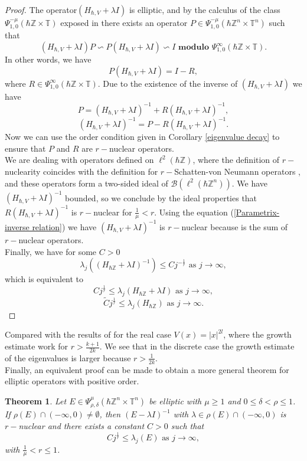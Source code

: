 \documentclass[pdflatex,sn-mathphys-num]{sn-jnl}%
\theoremstyle{thmstyleone}%
\newtheorem{theorem}{Theorem}
\theoremstyle{thmstyletwo}%
\theoremstyle{thmstylethree}%
\begin{document}
\begin{proof}
    The operator$(H_{\hbar,V}+\lambda I)$  is elliptic, and by the calculus of the class $\Psi^{-\mu}_{1,0}(\hbar\mathbb{Z}\times\mathbb{T})$ exposed in \cite[Theorem 4.7]{botchway2024semi} there exists an operator $P\in \Psi^{-\mu}_{1,0}(\hbar\mathbb{Z}^n\times\mathbb{T}^n)$ such that 
    \[ (H_{\hbar,V}+\lambda I)P\backsim P(H_{\hbar,V}+\lambda I)\backsim I \textbf{ modulo } \Psi^{\infty}_{1,0}(\hbar\mathbb{Z}\times\mathbb{T}).  \]
    In other words, we have 
    \[ P(H_{\hbar,V}+\lambda I)=I -R,  \]
    where $R\in\Psi^{\infty}_{1,0}(\hbar\mathbb{Z}\times\mathbb{T})$. Due to the existence of the inverse of $(H_{\hbar,V}+\lambda I) $ we have
    \[P=(H_{\hbar,V}+\lambda I)^{-1}+R(H_{\hbar,V}+\lambda I)^{-1}, \]
    \begin{equation}\label{Parametrix-inverse relation}
    (H_{\hbar,V}+\lambda I)^{-1}=P-R(H_{\hbar,V}+\lambda I)^{-1}.
    \end{equation}
    Now we can use the order condition given in Corollary \ref{eigenvalue decay} to ensure that $P$ and $R$ are $r-$nuclear operators. \\
    \indent We are dealing with operators defined on $\ell^2(\hbar\mathbb{Z})$, where the definition of $r-$nuclearity coincides with the definition for $r-$Schatten-von Neumann operators \cite{oloff}, and these operators form a two-sided ideal of $\mathcal{B}(\ell^2(\hbar\mathbb{Z}^n))$. We have $(H_{\hbar,V}+\lambda I)^{-1}$ bounded, so we conclude by the ideal properties that $R(H_{\hbar,V}+\lambda I)^{-1}$ is $r-$nuclear for $\frac{1}{\mu}<r$. Using the equation (\ref{Parametrix-inverse relation}) we have $(H_{\hbar,V}+\lambda I)^{-1}$ is $r-$nuclear because is the sum of $r-$nuclear operators.\\
    Finally, we have for some $C>0$ 
    \[ \lambda_j\left( (H_{\hbar\mathbb{Z}}+\lambda I)^{-1}\right) \leq C j^{-\frac{1}{r}}    \text{ as } j\to\infty, \]
    which is equivalent to 
    \[  C j^{\frac{1}{r}}\leq \lambda_j\left( H_{\hbar\mathbb{Z}}+\lambda I\right)    \text{ as } j\to\infty, \]
    \[  \widetilde{C} j^{\frac{1}{r}}\leq \lambda_j\left( H_{\hbar\mathbb{Z}}\right)    \text{ as } j\to\infty. \]
    
\end{proof}
\noindent Compared with the results of  \cite{chatzakou2021class} for the real case $V(x)=|x|^{2l}$, where the growth estimate work for $r>\frac{k+1}{2k}$. We see that in the discrete case the growth estimate of the eigenvalues is larger because $r>\frac{1}{2k}$.\\
\indent Finally, an equivalent proof can be made to obtain a more general theorem for elliptic operators with positive order. 
\begin{theorem}
    Let $E\in \Psi^{\mu}_{\rho,\delta}(\hbar\mathbb{Z}^n\times\mathbb{T}^n)$ be elliptic with $\mu\geq 1 $ and $0\leq \delta<\rho\leq 1$. If $\rho(E)\cap(-\infty,0)\neq \emptyset$, then $(E-\lambda I)^{-1}$ with $\lambda\in\rho(E)\cap(-\infty,0)$ is $r-$nuclear and there exists a constant $C>0$ such that
     \[C j^{\frac{1}{r}} \leq \lambda_j(E)  \text{ as } j\to\infty, \]
    with $\frac{1}{\mu}<r\leq 1$.
\end{theorem}
\end{document}

